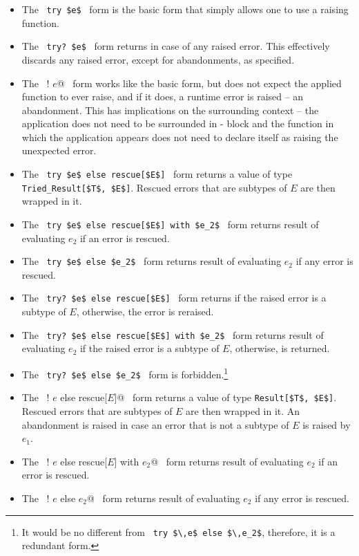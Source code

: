 \begin{itemize}
  \item The ~\lstinline!try $e$!~ form is the basic form that simply allows one to use a raising function. 

  \item The ~\lstinline!try? $e$!~ form returns  in case of any raised error. This effectively discards any raised error, except for abandonments, as specified. 

  \item The ~\lstinline@try! $e$@~ form works like the basic form, but does not expect the applied function to ever raise, and if it does, a runtime error is raised -- an abandonment. This has implications on the surrounding context -- the application does not need to be surrounded in - block and the function in which the application appears does not need to declare itself as raising the unexpected error. 

  \item The ~\lstinline!try $e$ else rescue[$E$]!~ form returns a value of type \lstinline!Tried_Result[$T$, $E$]!. Rescued errors that are subtypes of $E$ are then wrapped in it.
    
  \item The ~\lstinline!try $e$ else rescue[$E$] with $e_2$!~ form returns result of evaluating $e_2$ if an error is rescued. 
      
  \item The ~\lstinline!try $e$ else $e_2$!~ form returns result of evaluating $e_2$ if any error is rescued. 
 
  \item The ~\lstinline!try? $e$ else rescue[$E$]!~ form returns  if the raised error is a subtype of $E$, otherwise, the error is reraised. 
      
  \item The ~\lstinline!try? $e$ else rescue[$E$] with $e_2$!~ form returns result of evaluating $e_2$ if the raised error is a subtype of $E$, otherwise,  is returned. 
        
  \item The ~\lstinline!try? $e$ else $e_2$!~ form is forbidden.\footnote{It would be no different from ~\lstinline!try $\,e$ else $\,e_2$!, therefore, it is a redundant form.}
  
  \item The ~\lstinline@try! $e$ else rescue[$E$]@~ form returns a value of type \lstinline!Result[$T$, $E$]!. Rescued errors that are subtypes of $E$ are then wrapped in it. An abandonment is raised in case an error that is not a subtype of $E$ is raised by $e_1$.
      
  \item The ~\lstinline@try! $e$ else rescue[$E$] with $e_2$@~ form returns result of evaluating $e_2$ if an error is rescued. 
        
  \item The ~\lstinline@try! $e$ else $e_2$@~ form returns result of evaluating $e_2$ if any error is rescued. 
\end{itemize}

